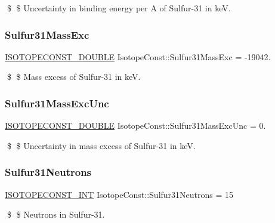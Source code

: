 \$ \$ Uncertainty in binding energy per A of Sulfur-\/31 in keV. \mbox{\label{group___isotope_const-_sulfur-_s31_ga806d359413f8f79c21415f4daf845bae}} 
\subsubsection{\texorpdfstring{Sulfur31\+Mass\+Exc}{Sulfur31MassExc}}
{\footnotesize\ttfamily \mbox{\hyperlink{group___isotope_const-_macros_ga8f45a7272ce02c0b4c65c44636ed719a}{I\+S\+O\+T\+O\+P\+E\+C\+O\+N\+S\+T\+\_\+\+D\+O\+U\+B\+LE}} Isotope\+Const\+::\+Sulfur31\+Mass\+Exc = -\/19042.}

\$ \$ Mass excess of Sulfur-\/31 in keV. \mbox{\label{group___isotope_const-_sulfur-_s31_gad5695e469ed8c2231f2bf86eb47c8cc0}} 
\subsubsection{\texorpdfstring{Sulfur31\+Mass\+Exc\+Unc}{Sulfur31MassExcUnc}}
{\footnotesize\ttfamily \mbox{\hyperlink{group___isotope_const-_macros_ga8f45a7272ce02c0b4c65c44636ed719a}{I\+S\+O\+T\+O\+P\+E\+C\+O\+N\+S\+T\+\_\+\+D\+O\+U\+B\+LE}} Isotope\+Const\+::\+Sulfur31\+Mass\+Exc\+Unc = 0.}

\$ \$ Uncertainty in mass excess of Sulfur-\/31 in keV. \mbox{\label{group___isotope_const-_sulfur-_s31_ga2a333a718f9a0844678a067ed7ea4012}} 
\subsubsection{\texorpdfstring{Sulfur31\+Neutrons}{Sulfur31Neutrons}}
{\footnotesize\ttfamily \mbox{\hyperlink{group___isotope_const-_macros_ga5f18360b3e99483a35c32d789e62621c}{I\+S\+O\+T\+O\+P\+E\+C\+O\+N\+S\+T\+\_\+\+I\+NT}} Isotope\+Const\+::\+Sulfur31\+Neutrons = 15}

\$ \$ Neutrons in Sulfur-\/31. \mbox{\label{group___isotope_const-_sulfur-_s31_ga25b464d32176264ada3a34dad01cb6b0}} 
